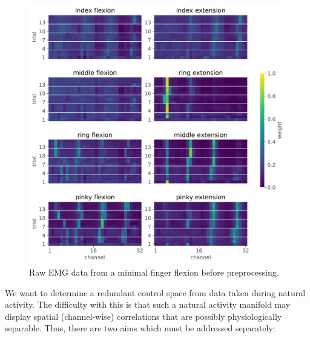 \documentclass[
  a4paper,
]{article}
\makeatletter
\newcounter{figno}
\newenvironment{fignos:no-prefix-figure-caption}{
  \caption@ifcompatibility{}{
    \let\oldthefigure\thefigure
    \let\oldtheHfigure\theHfigure
    \renewcommand{\thefigure}{figno:\thefigno}
    \renewcommand{\theHfigure}{figno:\thefigno}
    \stepcounter{figno}
    \captionsetup{labelformat=empty}
  }
}{
  \caption@ifcompatibility{}{
    \captionsetup{labelformat=default}
    \let\thefigure\oldthefigure
    \let\theHfigure\oldtheHfigure
    \addtocounter{figure}{-1}
  }
}
\makeatother
\begin{document}
\begin{fignos:no-prefix-figure-caption}

\begin{figure}
\centering
\includegraphics{images/data_analysis/fingers/PCA_components.pdf}
\caption{Raw EMG data from a minimal finger flexion before
preprocessing.}
\end{figure}

\end{fignos:no-prefix-figure-caption}

We want to determine a redundant control space from data taken during
natural activity. The difficulty with this is that such a natural
activity manifold may display spatial (channel-wise) correlations that
are possibly physiologically separable. Thus, there are two aims which
must be addressed separately:
\end{document}
